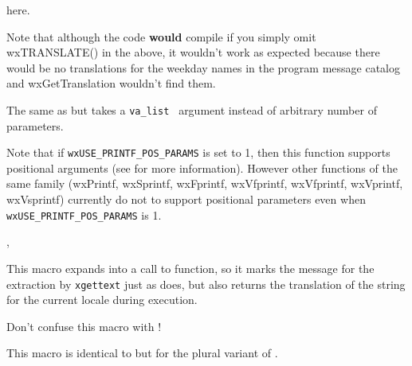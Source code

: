 here.

Note that although the code {\bf would} compile if you simply omit
wxTRANSLATE() in the above, it wouldn't work as expected because there would be
no translations for the weekday names in the program message catalog and
wxGetTranslation wouldn't find them.


\label{wxvsnprintf}


The same as  but takes a {\tt va\_list }
argument instead of arbitrary number of parameters.

Note that if \texttt{wxUSE\_PRINTF\_POS\_PARAMS} is set to 1, then this function supports
positional arguments (see  for more information).
However other functions of the same family (wxPrintf, wxSprintf, wxFprintf, wxVfprintf,
wxVfprintf, wxVprintf, wxVsprintf) currently do not to support positional parameters
even when \texttt{wxUSE\_PRINTF\_POS\_PARAMS} is 1.


, 



\membersection{\_}\label{underscore}


This macro expands into a call to 
function, so it marks the message for the extraction by {\tt xgettext} just as
 does, but also returns the translation of
the string for the current locale during execution.

Don't confuse this macro with !


\label{wxplural}


This macro is identical to  but for the plural variant
of .


\label{underscoret}


